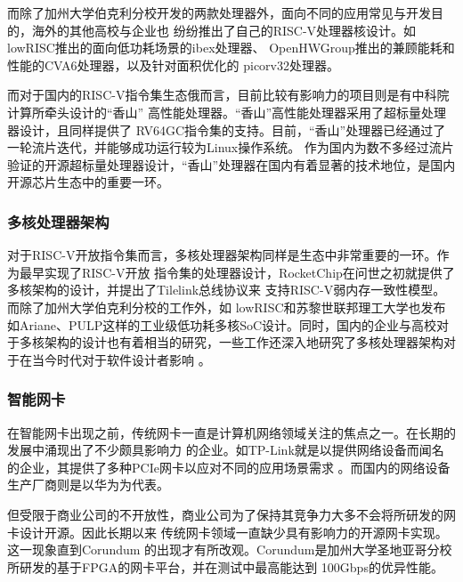 而除了加州大学伯克利分校开发的两款处理器外，面向不同的应用常见与开发目的，海外的其他高校与企业也
纷纷推出了自己的RISC-V处理器核设计。如lowRISC推出的面向低功耗场景的ibex处理器\cite{lowrisc_ibex}、
OpenHWGroup推出的兼顾能耗和性能的CVA6处理器\cite{zaruba2019cost}，以及针对面积优化的
picorv32处理器\cite{picorv32}。

而对于国内的RISC-V指令集生态俄而言，目前比较有影响力的项目则是有中科院计算所牵头设计的“香山”
高性能处理器\cite{xiangshan_riscv}。“香山”高性能处理器采用了超标量处理器设计，且同样提供了
RV64GC指令集的支持。目前，“香山”处理器已经通过了一轮流片迭代，并能够成功运行较为Linux操作系统。
作为国内为数不多经过流片验证的开源超标量处理器设计，“香山”处理器在国内有着显著的技术地位，是国内
开源芯片生态中的重要一环。

\subsubsection{多核处理器架构}

对于RISC-V开放指令集而言，多核处理器架构同样是生态中非常重要的一环。作为最早实现了RISC-V开放
指令集的处理器设计，RocketChip在问世之初就提供了多核架构的设计，并提出了Tilelink总线协议来
支持RISC-V弱内存一致性模型\cite{asanovic2016rocket}。而除了加州大学伯克利分校的工作外，如
lowRISC和苏黎世联邦理工大学也发布如Ariane、PULP这样的工业级低功耗多核SoC设计\cite{balkind2019openpiton+,
rossi2017energy}。同时，国内的企业与高校对于多核架构的设计也有着相当的研究\cite{manycore2013fudan,
gs464e2015recent}，一些工作还深入地研究了多核处理器架构对于在当今时代对于软件设计者影响
\cite{manycoretime2016recent}。

\subsubsection{智能网卡}
\label{section:present_smartnic}

在智能网卡出现之前，传统网卡一直是计算机网络领域关注的焦点之一。在长期的发展中涌现出了不少颇具影响力
的企业。如TP-Link就是以提供网络设备而闻名的企业，其提供了多种PCIe网卡以应对不同的应用场景需求
\cite{tplink_website}。而国内的网络设备生产厂商则是以华为为代表\cite{huawei_website}。

但受限于商业公司的不开放性，商业公司为了保持其竞争力大多不会将所研发的网卡设计开源。因此长期以来
传统网卡领域一直缺少具有影响力的开源网卡实现。这一现象直到Corundum\cite{forencich2020corundum}
的出现才有所改观。Corundum是加州大学圣地亚哥分校所研发的基于FPGA的网卡平台，并在测试中最高能达到
100Gbps的优异性能。

